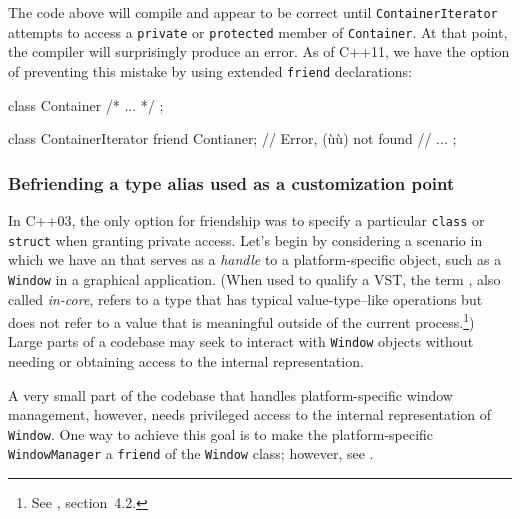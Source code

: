 \noindent The code above will compile and appear to be correct until
\lstinline!ContainerIterator! attempts to access a \lstinline!private! or
\lstinline!protected! member of \lstinline!Container!. At that point, the
compiler will surprisingly produce an error. As of C++11, we have the
option of preventing this mistake by using extended \lstinline!friend!
declarations:

\begin{emcppslisting}
class Container { /* ... */ };

class ContainerIterator
{
    friend Contianer;  // Error, (ù{}ù) not found
    // ...
};
\end{emcppslisting}


\subsubsection[Befriending a type alias used as a customization point]{Befriending a type alias used as a customization point}\label{befriending-a-type-alias-used-as-a-customization-point}

In C++03, the only option for friendship was to specify a particular
\lstinline!class! or \lstinline!struct! when granting private access. Let's
begin by considering a scenario in which we have an
 
that serves as a \emph{handle} to a platform-specific object, such as a
\lstinline!Window! in a graphical application. (When used to qualify a VST, the
term , also called \emph{in-core}, refers to a type
that has typical value-type--like operations but does not refer to a
value that is meaningful outside of the current process.\footnote{See
  \cite{lakos2a}, section~4.2.}) Large parts of a codebase
may seek to interact with \lstinline!Window! objects without needing or
obtaining access to the internal representation.

A very small part of the codebase that handles platform-specific window
management, however, needs privileged access to the internal
representation of \lstinline!Window!. One way to achieve this goal is to
make the platform-specific \lstinline!WindowManager! a \lstinline!friend! of
the \lstinline!Window! class; however, see .

